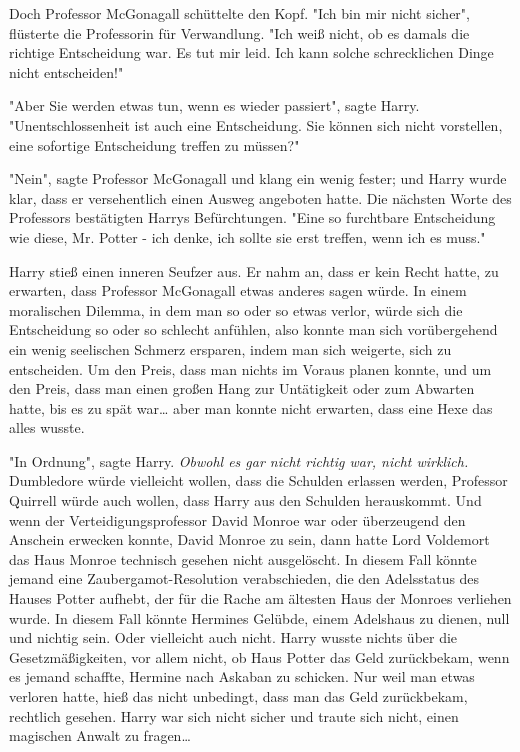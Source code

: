 {Doch Professor McGonagall schüttelte den Kopf. "Ich bin mir nicht sicher", flüsterte die Professorin für Verwandlung. "Ich weiß nicht, ob es damals die richtige Entscheidung war. Es tut mir leid. Ich kann solche schrecklichen Dinge nicht entscheiden!"

"Aber Sie werden etwas tun, wenn es wieder passiert", sagte Harry. "Unentschlossenheit ist auch eine Entscheidung. Sie können sich nicht vorstellen, eine sofortige Entscheidung treffen zu müssen?"

"Nein", sagte Professor McGonagall und klang ein wenig fester; und Harry wurde klar, dass er versehentlich einen Ausweg angeboten hatte. Die nächsten Worte des Professors bestätigten Harrys Befürchtungen. "Eine so furchtbare Entscheidung wie diese, Mr. Potter - ich denke, ich sollte sie erst treffen, wenn ich es muss."

Harry stieß einen inneren Seufzer aus. Er nahm an, dass er kein Recht hatte, zu erwarten, dass Professor McGonagall etwas anderes sagen würde. In einem moralischen Dilemma, in dem man so oder so etwas verlor, würde sich die Entscheidung so oder so schlecht anfühlen, also konnte man sich vorübergehend ein wenig seelischen Schmerz ersparen, indem man sich weigerte, sich zu entscheiden. Um den Preis, dass man nichts im Voraus planen konnte, und um den Preis, dass man einen großen Hang zur Untätigkeit oder zum Abwarten hatte, bis es zu spät war… aber man konnte nicht erwarten, dass eine Hexe das alles wusste.

"In Ordnung", sagte Harry. \emph{Obwohl es gar nicht richtig war, nicht wirklich.} Dumbledore würde vielleicht wollen, dass die Schulden erlassen werden, Professor Quirrell würde auch wollen, dass Harry aus den Schulden herauskommt. Und wenn der Verteidigungsprofessor David Monroe war oder überzeugend den Anschein erwecken konnte, David Monroe zu sein, dann hatte Lord Voldemort das Haus Monroe technisch gesehen nicht ausgelöscht. In diesem Fall könnte jemand eine Zaubergamot-Resolution verabschieden, die den Adelsstatus des Hauses Potter aufhebt, der für die Rache am ältesten Haus der Monroes verliehen wurde. In diesem Fall könnte Hermines Gelübde, einem Adelshaus zu dienen, null und nichtig sein. Oder vielleicht auch nicht. Harry wusste nichts über die Gesetzmäßigkeiten, vor allem nicht, ob Haus Potter das Geld zurückbekam, wenn es jemand schaffte, Hermine nach Askaban zu schicken. Nur weil man etwas verloren hatte, hieß das nicht unbedingt, dass man das Geld zurückbekam, rechtlich gesehen. Harry war sich nicht sicher und traute sich nicht, einen magischen Anwalt zu fragen…

}
